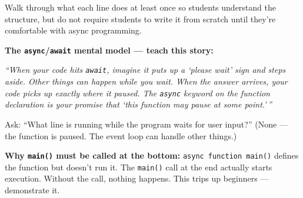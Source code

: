 \documentclass[
  justified,
  openright,
]{tufte-book}
\newcommand{\BuiltInTok}[1]{#1}
\newcommand{\CommentTok}[1]{\textcolor{MidGray}{#1}}
\newcommand{\ControlFlowTok}[1]{\textcolor{BrandBlue}{#1}}
\newcommand{\FunctionTok}[1]{\textcolor{BrandBlue}{#1}}
\newcommand{\KeywordTok}[1]{\textcolor{BrandBlue}{#1}}
\newcommand{\NormalTok}[1]{#1}
\newcommand{\OperatorTok}[1]{\textcolor{DarkGray}{#1}}
\newcommand{\SpecialCharTok}[1]{\textcolor{Teal}{#1}}
\newcommand{\StringTok}[1]{\textcolor{Teal}{#1}}
\newcommand{\VerbatimStringTok}[1]{\textcolor{Teal}{#1}}
\newenvironment{Shaded}{%
  \begin{snugshade}
}{%
  \end{snugshade}
}
\begin{document}
Walk through what each line does at least once so students understand
the structure, but do not require students to write it from scratch
until they're comfortable with async programming.

\textbf{The \texttt{async}/\texttt{await} mental model --- teach this
story:}

\emph{``When your code hits \texttt{await}, imagine it puts up a `please
wait' sign and steps aside. Other things can happen while you wait. When
the answer arrives, your code picks up exactly where it paused. The
\texttt{async} keyword on the function declaration is your promise that
`this function may pause at some point.'\,''}

\begin{Shaded}
\end{Shaded}

Ask: ``What line is running while the program waits for user input?''
(None --- the function is paused. The event loop can handle other
things.)

\textbf{Why \texttt{main()} must be called at the bottom:}
\texttt{async\ function\ main()} defines the function but doesn't run
it. The \texttt{main()} call at the end actually starts execution.
Without the call, nothing happens. This trips up beginners ---
demonstrate it.
\end{document}
